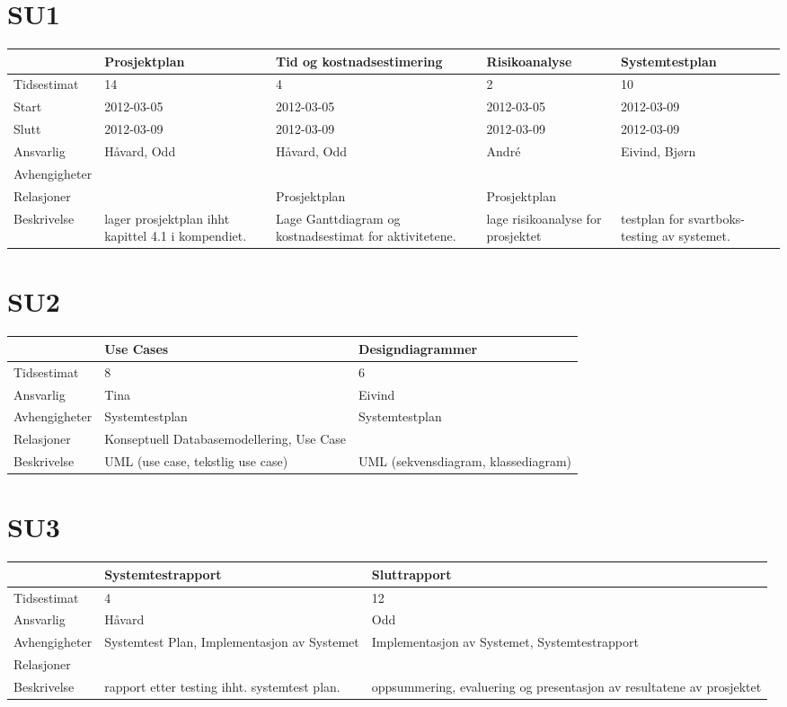 \documentclass{article}
\begin{document}
\section{SU1}

\begin{tabular}{|l|p{3cm}|p{3cm}|p{3cm}|p{3cm}|}
\hline
& Prosjektplan & Tid og kostnadsestimering & Risikoanalyse & Systemtestplan
\\ \hline
Tidsestimat & 14 & 4 & 2 & 10 \\ \hline
Start & 2012-03-05 & 2012-03-05 & 2012-03-05 & 2012-03-09 \\ \hline
Slutt & 2012-03-09 & 2012-03-09 & 2012-03-09 & 2012-03-09 \\ \hline
Ansvarlig & H\aa vard, Odd & H\aa vard, Odd & Andr\'{e} & Eivind, Bj\o rn \\ 
\hline
Avhengigheter &  &  &  &  \\ \hline
Relasjoner &  & Prosjektplan & Prosjektplan &  \\ \hline
Beskrivelse & lager prosjektplan ihht kapittel 4.1 i kompendiet. & Lage
Ganttdiagram og kostnadsestimat for aktivitetene. & lage risikoanalyse for
prosjektet & testplan for svartboks-testing av systemet. \\ \hline
\end{tabular}

\section{SU2}

\begin{tabular}{|l|p{3cm}|p{3cm}|}
\hline
& Use Cases & Designdiagrammer \\ \hline
Tidsestimat & 8 & 6 \\ \hline
Ansvarlig & Tina & Eivind \\ \hline
Avhengigheter & Systemtestplan & Systemtestplan \\ \hline
Relasjoner & Konseptuell Databasemodellering, Use Case &  \\ \hline
Beskrivelse & UML (use case, tekstlig use case) & UML (sekvensdiagram,
klassediagram) \\ \hline
\end{tabular}

\section{SU3}

\begin{tabular}{|l|p{3cm}|p{3cm}|}
\hline
& Systemtestrapport & Sluttrapport \\ \hline
Tidsestimat & 4 & 12 \\ \hline
Ansvarlig & H\aa vard & Odd \\ \hline
Avhengigheter & Systemtest Plan, Implementasjon av Systemet & Implementasjon
av Systemet, Systemtestrapport \\ \hline
Relasjoner &  &  \\ \hline
Beskrivelse & rapport etter testing ihht. systemtest plan. & oppsummering,
evaluering og presentasjon av resultatene av prosjektet \\ \hline
\end{tabular}
\end{document}
